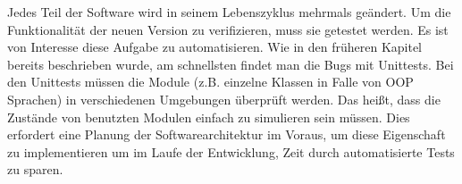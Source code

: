 Jedes Teil der Software wird in seinem Lebenszyklus mehrmals geändert. 
Um die Funktionalität der neuen Version zu verifizieren, muss sie getestet werden.
Es ist von Interesse diese Aufgabe zu automatisieren. 
Wie in den früheren Kapitel bereits beschrieben wurde, am schnellsten findet man die Bugs mit Unittests. 
Bei den Unittests müssen die Module (z.B. einzelne Klassen in Falle von OOP Sprachen) in verschiedenen Umgebungen überprüft werden. 
Das heißt, dass die Zustände von benutzten Modulen einfach zu simulieren sein müssen.
Dies erfordert eine Planung der Softwarearchitektur im Voraus, 
um diese Eigenschaft zu implementieren um im Laufe der Entwicklung, Zeit durch automatisierte Tests zu sparen.
